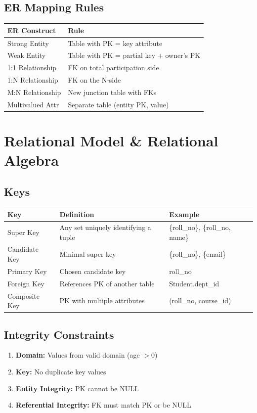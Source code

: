 \documentclass[12pt,a4paper]{article}
\begin{document}
\subsection{ER Mapping Rules}
\begin{center}
\begin{tabular}{@{}l p{8cm}@{}}
\toprule
\textbf{ER Construct} & \textbf{Rule} \\
\midrule
Strong Entity & Table with PK = key attribute \\
Weak Entity & Table with PK = partial key + owner's PK \\
1:1 Relationship & FK on total participation side \\
1:N Relationship & FK on the N-side \\
M:N Relationship & New junction table with FKs \\
Multivalued Attr & Separate table (entity PK, value) \\
\bottomrule
\end{tabular}
\end{center}

\section{Relational Model \& Relational Algebra}

\subsection{Keys}
\begin{center}
\begin{tabular}{@{}l p{5cm} p{4cm}@{}}
\toprule
\textbf{Key} & \textbf{Definition} & \textbf{Example} \\
\midrule
Super Key & Any set uniquely identifying a tuple & \{roll\_no\}, \{roll\_no, name\} \\
Candidate Key & Minimal super key & \{roll\_no\}, \{email\} \\
Primary Key & Chosen candidate key & roll\_no \\
Foreign Key & References PK of another table & Student.dept\_id \\
Composite Key & PK with multiple attributes & (roll\_no, course\_id) \\
\bottomrule
\end{tabular}
\end{center}

\subsection{Integrity Constraints}
\begin{enumerate}[leftmargin=*]
    \item \textbf{Domain:} Values from valid domain (age $> 0$)
    \item \textbf{Key:} No duplicate key values
    \item \textbf{Entity Integrity:} PK cannot be NULL
    \item \textbf{Referential Integrity:} FK must match PK or be NULL
\end{enumerate}
\end{document}
